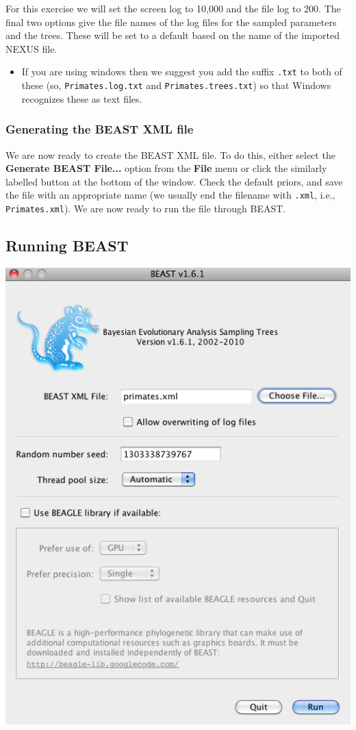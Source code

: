 \documentclass[12pt]{article}
\begin{document}
For this exercise we will set the screen log to 10,000 and the file log to 200. The final two
options give the file names of the log files for the sampled parameters and
the trees. These will be set to a default based on the name of the
imported NEXUS file. 

\begin{itemize}
\item If you are using windows then we suggest you add the suffix \texttt{.txt} to both of these (so,
\texttt{Primates.log.txt} and \texttt{Primates.trees.txt}) so that Windows recognizes
these as text files. 
\end{itemize}

\subsubsection*{Generating the BEAST XML file }

We are now ready to create the BEAST XML file. To do this,
either select the \textbf{Generate BEAST File...} option from the \textbf{File} menu or click the similarly labelled button at the bottom of the
window. Check the default priors, and save the file with an appropriate name
(we usually end the filename with \texttt{.xml}, i.e., \texttt{Primates.xml}).
We are now ready to run the file through BEAST. 

\subsection*{Running BEAST }

\medskip{}

\includegraphics[scale=0.5]{figures/BEAST}
\end{document}
